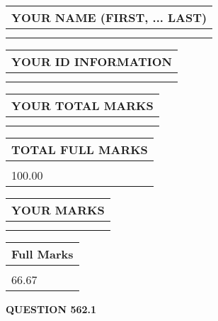 \documentclass{ctexart}
\begin{document}
   
   
   
\newpage 
\setcounter{page}{ 
   562001 } 
   
   
   
   
\noindent\begin{tabular}{|l|}
\hline
YOUR NAME (FIRST, ... LAST)  \\
\hline
 \\ 
 \\ 
\hline
\end{tabular}
\hspace{0.05in} \begin{tabular}{|l|}
\hline
 YOUR   ID   INFORMATION  \\
\hline
 \\ 
 \\ 
\hline
\end{tabular}
   
   
\vspace{0.2in}\noindent\begin{tabular}{|l|}
\hline
YOUR TOTAL MARKS  \\
\hline
 \\ 
 \\ 
\hline
\end{tabular}
\hspace{0.05in} \begin{tabular}{|l|}
\hline
TOTAL FULL MARKS  \\
\hline
 \\ 
100.00 \\
\hline
\end{tabular}
   
   
 \vspace{0.2in}
 
 
 
 
   
   
  
\vspace{0.2in}
  
\noindent\begin{tabular}{|l|}
\hline
 YOUR MARKS  \\
\hline
 \\ 
 \\ 
\hline
\end{tabular}
\hspace{0.05in} \begin{tabular}{|l|}
\hline
 Full Marks  \\
\hline
 \\ 
66.67 \\
\hline
\end{tabular}
{\textbf{\Large{QUESTION
562.1 
}}}
  
\end{document}
